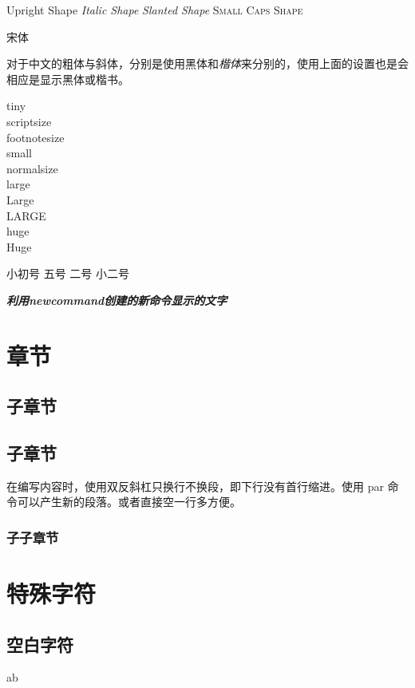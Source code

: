 \documentclass[UTF8]{ctexart}   %
\newcommand{\myfont}{\textit{\textbf{\textsf{利用newcommand创建的新命令显示的文字}}}}
\begin{document}
    {\upshape Upright Shape} {\itshape Italic Shape} {\slshape Slanted Shape} {\scshape Small Caps Shape}

    {\songti 宋体}   

    对于中文的粗体与斜体，分别是使用{\mdseries 黑体}和{\itshape 楷体}来分别的，使用上面的设置也是会相应是显示黑体或楷书。

    {\tiny tiny}\\{\scriptsize scriptsize}\\{\footnotesize footnotesize}\\
    {\small small}\\{\normalsize normalsize}\\{\large large}\\
    {\Large Large}\\{\LARGE LARGE}\\{\huge huge}\\{\Huge Huge}

    { 小初号} { 五号} { 二号} { 小二号}

    \myfont

    \section{章节}
    \subsection{子章节}
    \subsection{子章节}
    在编写内容时，使用双反斜杠只换行不换段，即下行没有首行缩进。使用 par 命令可以产生新的段落。或者直接空一行多方便。
    \subsubsection{子子章节}
    \section{特殊字符}
    \subsection{空白字符}
    a\quad b 
\end{document}
